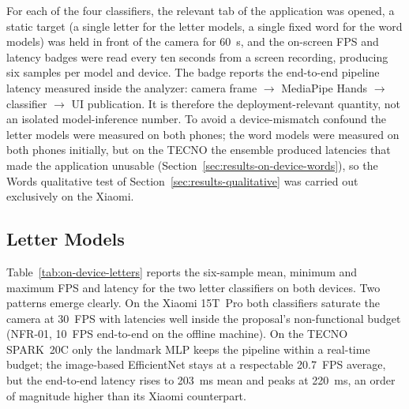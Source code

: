 For each of the four classifiers, the relevant tab of the application
was opened, a static target (a single letter for the letter models, a
single fixed word for the word models) was held in front of the camera
for \SI{60}{\second}, and the on-screen FPS and latency badges were
read every ten seconds from a screen recording, producing six samples
per model and device. The badge reports the end-to-end pipeline
latency measured inside the analyzer: camera frame
$\rightarrow$ MediaPipe Hands $\rightarrow$ classifier
$\rightarrow$ UI publication. It is therefore the deployment-relevant
quantity, not an isolated model-inference number. To avoid a
device-mismatch confound the letter models were measured on both
phones; the word models were measured on both phones initially, but
on the TECNO the ensemble produced latencies that made the application
unusable (Section~\ref{sec:results-on-device-words}), so the Words
qualitative test of Section~\ref{sec:results-qualitative} was carried
out exclusively on the Xiaomi.

\subsection{Letter Models}
\label{sec:results-on-device-letters}

Table~\ref{tab:on-device-letters} reports the six-sample mean,
minimum and maximum FPS and latency for the two letter classifiers on
both devices. Two patterns emerge clearly. On the Xiaomi 15T~Pro both
classifiers saturate the camera at \SI{30}{FPS} with latencies well
inside the proposal's non-functional budget (NFR-01, \SI{10}{FPS}
end-to-end on the offline machine). On the TECNO SPARK~20C only the
landmark MLP keeps the pipeline within a real-time budget; the
image-based EfficientNet stays at a respectable \SI{20.7}{FPS}
average, but the end-to-end latency rises to \SI{203}{ms} mean and
peaks at \SI{220}{ms}, an order of magnitude higher than its Xiaomi
counterpart.

\begin{table}[!ht]
\centering
\caption{On-device throughput and latency of the two letter classifiers.}
\label{tab:on-device-letters}
\end{table}

